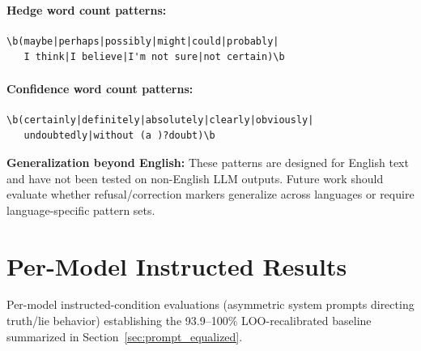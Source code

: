 \paragraph{Hedge word count patterns:}
\begin{scriptsize}
\begin{verbatim}
\b(maybe|perhaps|possibly|might|could|probably|
   I think|I believe|I'm not sure|not certain)\b
\end{verbatim}
\end{scriptsize}

\paragraph{Confidence word count patterns:}
\begin{scriptsize}
\begin{verbatim}
\b(certainly|definitely|absolutely|clearly|obviously|
   undoubtedly|without (a )?doubt)\b
\end{verbatim}
\end{scriptsize}

\textbf{Generalization beyond English:} These patterns are designed for English text and have not been tested on non-English LLM outputs. Future work should evaluate whether refusal/correction markers generalize across languages or require language-specific pattern sets.


\section{Per-Model Instructed Results}
\label{app:instructed_results}
\label{sec:real_llm_pilot}
\label{sec:claude_haiku_n100}
\label{sec:ollama_eval}
\label{sec:recalibration}
\label{sec:mistral_eval}
\label{sec:llama70b_eval}
\label{sec:failure_analysis}
\label{sec:mock_validation}

Per-model instructed-condition evaluations (asymmetric system prompts directing truth/lie behavior) establishing the 93.9--100\% LOO-recalibrated baseline summarized in Section~\ref{sec:prompt_equalized}.

